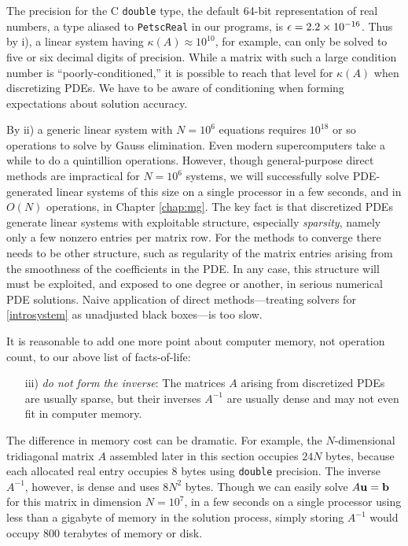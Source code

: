 The precision for the C \texttt{double} type, the default 64-bit representation of real numbers, a type aliased to \texttt{PetscReal} in our \PETSc programs, is $\epsilon = 2.2 \times 10^{-16}$.  Thus by i), a linear system having $\kappa(A) \approx 10^{10}$, for example, can only be solved to five or six decimal digits of precision.  While a matrix with such a large condition number is ``poorly-conditioned,'' it is possible to reach that level for $\kappa(A)$ when discretizing PDEs.  We have to be aware of conditioning when forming expectations about solution accuracy.

By ii) a generic linear system with $N=10^6$ equations requires $10^{18}$ or so operations to solve by Gauss elimination.  Even modern supercomputers take a while to do a quintillion operations.  However, though general-purpose direct methods are impractical for $N=10^6$ systems, we will successfully solve PDE-generated linear systems of this size on a single processor in a few seconds, and in $O(N)$ operations, in Chapter \ref{chap:mg}.  The key fact is that discretized PDEs generate linear systems with exploitable structure, especially \emph{sparsity}, namely only a few nonzero entries per matrix row.  For the methods to converge there needs to be other structure, such as regularity of the matrix entries arising from the smoothness of the coefficients in the PDE.  In any case, this structure will must be exploited, and exposed to one degree or another, in serious numerical PDE solutions.  Naive application of direct methods---treating solvers for \eqref{introsystem} as unadjusted black boxes---is too slow.

It is reasonable to add one more point about computer memory, not operation count, to our above list of facts-of-life:
\begin{enumerate}
\item[iii)] \emph{do not form the inverse}:  The matrices $A$ arising from discretized PDEs are usually sparse, but their inverses $A^{-1}$ are usually dense and may not even fit in computer memory.
\end{enumerate}

The difference in memory cost can be dramatic.  For example, the $N$-dimensional tridiagonal matrix $A$ assembled later in this section occupies $24 N$ bytes, because each allocated real entry occupies 8 bytes using \texttt{double} precision.  The inverse $A^{-1}$, however, is dense and uses $8 N^2$ bytes.  Though we can easily solve $A\mathbf{u}=\mathbf{b}$ for this matrix in dimension $N=10^7$, in a few seconds on a single processor using less than a gigabyte of memory in the solution process, simply storing $A^{-1}$ would occupy $800$ terabytes of memory or disk.
\vfill



